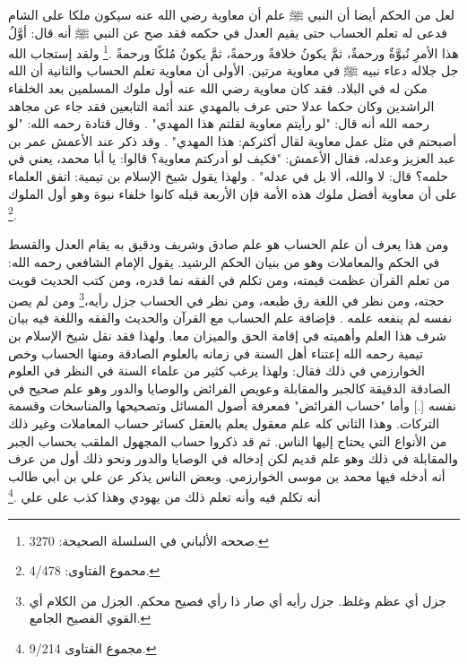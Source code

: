 لعل من الحكم أيضا أن النبي ﷺ علم أن معاوية رضي الله عنه سيكون ملكا على الشام فدعى له تعلم الحساب حتى يقيم العدل في حكمه فقد صح عن النبي ﷺ أنه قال: أوَّلُ هذا الأمرِ نُبوَّةٌ ورحمةٌ، ثمَّ يكونُ خلافةً ورحمةً، ثمَّ يكونُ مُلكًا ورحمةً \href{https://shamela.ws/book/9442/5496#p12}{\faExternalLink} \cite{albani_Sahiha}.\footnote{صححه الألباني في السلسلة الصحيحة: 3270.} ولقد إستجاب الله جل جلاله دعاء نبيه ﷺ في معاوية مرتين. الأولى أن معاوية تعلم الحساب والثانية أن الله مكن له في البلاد. فقد كان معاوية رضي الله عنه أول ملوك المسلمين بعد الخلفاء الراشدين وكان حكما عدلا حتى عرف بالمهدي عند أئمة التابعين فقد جاء عن مجاهد رحمه الله أنه قال: "لو رأيتم معاوية لقلتم هذا المهدي" \href{https://shamela.ws/book/1077/702#p1}{\faExternalLink}. وقال قتادة رحمه الله: "لو أصبحتم في مثل عمل معاوية لقال أكثركم: هذا المهدي" \href{https://shamela.ws/book/1077/701#p1}{\faExternalLink}. وقد ذكر عند الأعمش عمر بن عبد العزيز وعدله، فقال الأعمش: "فكيف لو أدركتم معاوية؟ قالوا: يا أبا محمد، يعني في حلمه؟ قال: لا والله، ألا بل في عدله" \href{https://shamela.ws/book/1077/700#p1}{\faExternalLink} \href{https://shamela.ws/book/927/3063#p3}{\faExternalLink}. ولهذا يقول شيخ الإسلام بن تيمية: اتفق العلماء على أن معاوية أفضل ملوك هذه الأمة فإن الأربعة قبله كانوا خلفاء نبوة وهو أول الملوك \href{https://shamela.ws/book/7289/1800#p1}{\faExternalLink} \cite{ibnTaimia_Majmoo}.\footnote{محموع الفتاوى: 4/478.} 

ومن هذا يعرف أن علم الحساب هو علم صادق وشريف ودقيق به يقام العدل والقسط في الحكم والمعاملات وهو من بنيان الحكم الرشيد. يقول الإمام الشافعي رحمه الله: من تعلم القرآن عظمت قيمته، ومن تكلم في الفقه نما قدره، ومن كتب الحديث قويت حجته، ومن نظر في اللغة رق طبعه، ومن نظر في الحساب جزل رأيه،\footnote{جزل أي عظم وغلظ. جزل رأيه أي صار ذا رأي فصيح محكم. الجزل من الكلام أي القوي الفصيح الجامع.} ومن لم يصن نفسه لم ينفعه علمه \href{https://shamela.ws/book/22669/4471#p4}{\faExternalLink} \href{https://shamela.ws/book/10495/14224#p1}{\faExternalLink} \cite{dahabi_Siyar}. فإضافة علم الحساب مع القرآن والحديث والفقه واللغة فيه بيان شرف هذا العلم وأهميته في إقامة الحق والميزان معا. ولهذا فقد نقل شيخ الإسلام بن تيمية رحمه الله إعتناء أهل السنة في زمانه بالعلوم الصادقة ومنها الحساب وخص الخوارزمي في ذلك فقال: ولهذا يرغب كثير من علماء السنة في النظر في العلوم الصادقة الدقيقة كالجبر والمقابلة وعويص الفرائض والوصايا والدور وهو علم صحيح في نفسه [.] وأما "حساب الفرائض" فمعرفة أصول المسائل وتصحيحها والمناسخات وقسمة التركات. وهذا الثاني كله علم معقول يعلم بالعقل كسائر حساب المعاملات وغير ذلك من الأنواع التي يحتاج إليها الناس. ثم قد ذكروا حساب المجهول الملقب بحساب الجبر والمقابلة في ذلك وهو علم قديم لكن إدخاله في الوصايا والدور ونحو ذلك أول من عرف أنه أدخله فيها محمد بن موسى الخوارزمي. وبعض الناس يذكر عن علي بن أبي طالب أنه تكلم فيه وأنه تعلم ذلك من يهودي وهذا كذب على علي
\href{https://shamela.ws/book/7289/4478#p2}{\faExternalLink} \cite{ibnTaimia_Majmoo}.\footnote{مجموع الفتاوى 9/214.} 

